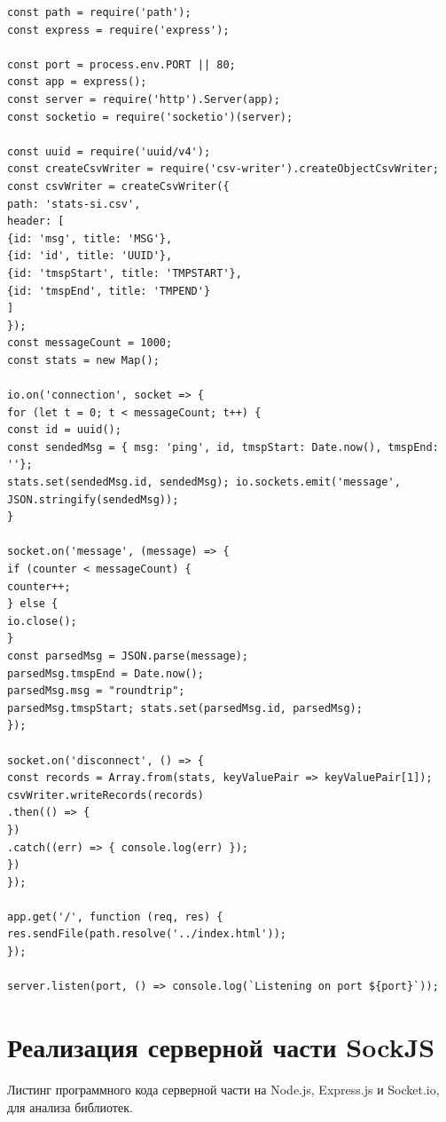 \begin{lstlisting}
const path = require('path');
const express = require('express');

const port = process.env.PORT || 80;
const app = express();
const server = require('http').Server(app); 
const socketio = require('socketio')(server);

const uuid = require('uuid/v4');
const createCsvWriter = require('csv-writer').createObjectCsvWriter; const csvWriter = createCsvWriter({
path: 'stats-si.csv',
header: [
{id: 'msg', title: 'MSG'},
{id: 'id', title: 'UUID'},
{id: 'tmspStart', title: 'TMPSTART'},
{id: 'tmspEnd', title: 'TMPEND'}
] 
});
const messageCount = 1000;
const stats = new Map();

io.on('connection', socket => {
for (let t = 0; t < messageCount; t++) {
const id = uuid();
const sendedMsg = { msg: 'ping', id, tmspStart: Date.now(), tmspEnd: ''};
stats.set(sendedMsg.id, sendedMsg); io.sockets.emit('message', JSON.stringify(sendedMsg));
}

socket.on('message', (message) => {
if (counter < messageCount) {
counter++;
} else {
io.close();
}
const parsedMsg = JSON.parse(message);
parsedMsg.tmspEnd = Date.now();
parsedMsg.msg = "roundtrip";
parsedMsg.tmspStart; stats.set(parsedMsg.id, parsedMsg);
});

socket.on('disconnect', () => {
const records = Array.from(stats, keyValuePair => keyValuePair[1]);
csvWriter.writeRecords(records)
.then(() => {
})
.catch((err) => { console.log(err) });
})
});

app.get('/', function (req, res) {
res.sendFile(path.resolve('../index.html'));
});

server.listen(port, () => console.log(`Listening on port ${port}`));
\end{lstlisting}

\chapter{Реализация серверной части SockJS}
\label{appendix:serverSideBySockJS}

Листинг программного кода серверной части на Node.js, Express.js и Socket.io, для анализа библиотек.

